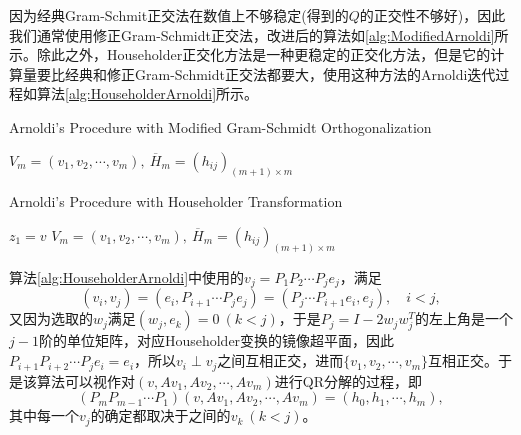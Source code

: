 \documentclass[a4paper,10pt]{ctexart}
\begin{document}
因为经典Gram-Schmit正交法在数值上不够稳定(得到的$ Q $的正交性不够好)，因此我们通常使用修正Gram-Schmidt正交法，改进后的算法如\ref{alg:ModifiedArnoldi}所示。除此之外，Householder正交化方法是一种更稳定的正交化方法，但是它的计算量要比经典和修正Gram-Schmidt正交法都要大，使用这种方法的Arnoldi迭代过程如算法\ref{alg:HouseholderArnoldi}所示。
\begin{algorithm}[htbp]
    \caption{Arnoldi's Procedure with Modified Gram-Schmidt Orthogonalization}\label{alg:ModifiedArnoldi}
    \Return $ V_m = (v_1, v_2, \cdots , v_m),\ \overline{H}_m = (h_{ij})_{(m+1)\times m} $\;
\end{algorithm}

\begin{algorithm}[htbp]
    \caption{Arnoldi's Procedure with Householder Transformation}\label{alg:HouseholderArnoldi}
    $ z_1 = v $\;
    \Return $ V_m = (v_1, v_2, \cdots , v_m),\ \overline{H}_m = (h_{ij})_{(m+1)\times m} $\;
\end{algorithm}

算法\ref{alg:HouseholderArnoldi}中使用的$ v_j = P_1P_2\cdots P_je_j $，满足
\[
    (v_i,v_j) = (e_i, P_{i+1}\cdots P_je_j) = (P_{j}\cdots P_{i+1} e_i, e_j),\quad i<j,
\]
又因为选取的$ w_j $满足$ (w_j,e_k) = 0\ (k<j) $，于是$ P_j=I-2w_jw^T_j $的左上角是一个$ j-1 $阶的单位矩阵，对应Householder变换的镜像超平面，因此$ P_{i+1}P_{i+2}\cdots P_{j}e_i = e_i $，所以$ v_i\perp v_j $之间互相正交，进而$ \{v_1,v_2,\cdots ,v_m\} $互相正交。于是该算法可以视作对$ (v,Av_1,Av_2,\cdots ,Av_m) $进行QR分解的过程，即
\[
    (P_mP_{m-1}\cdots P_1)(v,Av_1,Av_2,\cdots ,Av_m) = (h_0,h_1,\cdots ,h_m),
\]
其中每一个$ v_j $的确定都取决于之间的$ v_k\ (k<j) $。
\end{document}
